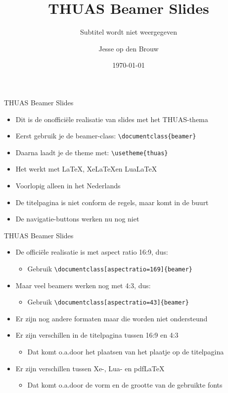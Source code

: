 \documentclass[fleqn,aspectratio=169,dutch]{beamer}
\title{THUAS Beamer Slides}
\subtitle{Subtitel wordt niet weergegeven}
\author{Jesse op den Brouw}
\date{\today}
\begin{document}
\maketitle

\begin{frame}[fragile]{THUAS Beamer Slides}
\begin{itemize}
\item Dit is de onofficiële realisatie van slides met het THUAS-thema
\item Eerst gebruik je de beamer-class: \lstinline|\documentclass{beamer}|
\item Daarna laadt je de theme met: \lstinline|\usetheme{thuas}|
\item Het werkt met \LaTeX, Xe\LaTeX en Lua\LaTeX
\item Voorlopig alleen in het Nederlands
\item De titelpagina is niet conform de regels, maar komt in de buurt
\item De navigatie-buttons werken nu nog niet
\end{itemize}
\end{frame}

\begin{frame}[fragile]{THUAS Beamer Slides}
\begin{itemize}
\item De officiële realisatie is met aspect ratio 16:9, dus:
\begin{itemize}
\item Gebruik \lstinline|\documentclass[aspectratio=169]{beamer}|
\end{itemize}
\item Maar veel beamers werken nog met 4:3, dus:
\begin{itemize}
\item Gebruik \lstinline|\documentclass[aspectratio=43]{beamer}|
\end{itemize}
\item Er zijn nog andere formaten maar die worden niet ondersteund
\item Er zijn verschillen in de titelpagina tussen 16:9 en 4:3
\begin{itemize}
\item Dat komt o.a.\@ door het plaatsen van het plaatje op de titelpagina
\end{itemize}
\item Er zijn verschillen tussen Xe-, Lua- en pdf\LaTeX
\begin{itemize}
\item Dat komt o.a.\@ door de vorm en de grootte van de gebruikte fonts
\end{itemize}
\end{itemize}
\end{frame}
\end{document}
